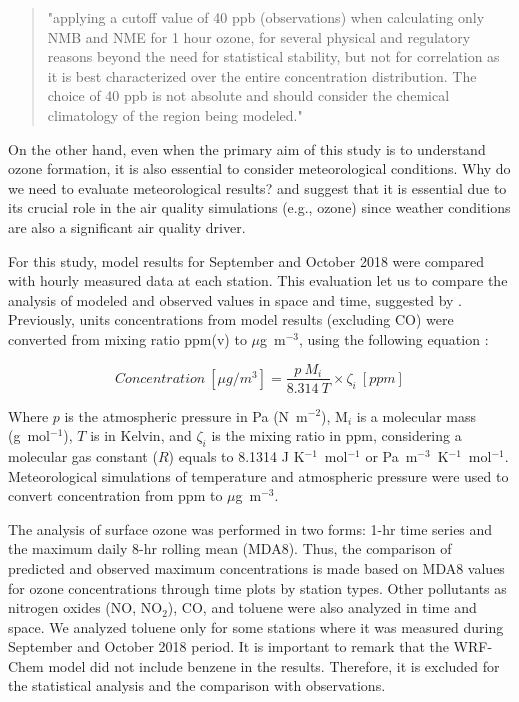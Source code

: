   \begin{quote}
  	"applying a cutoff value of 40 ppb (observations) when calculating only NMB and NME for 1 hour ozone, for several physical and regulatory reasons beyond the need for statistical stability, but not for correlation as it is best characterized over the entire concentration distribution. The choice of 40 ppb is not absolute and should consider the chemical climatology of the region being modeled."
  \end{quote}
  
  On the other hand, even when the primary aim of this study is to understand ozone formation, it is also essential to consider meteorological conditions.
  Why do we need to evaluate meteorological results?  \citet{Emery2017} and \citet{Monk2019} suggest that it is essential due to its crucial role in the air quality simulations (e.g., ozone) since weather conditions are also a significant air quality driver.
  
  For this study, model results for September and October 2018 were compared with hourly measured data at each station.
  This evaluation let us to compare the analysis of modeled and observed values in space and time, suggested by \citet{Seinfeld2016}.
  Previously, units concentrations from model results (excluding CO) were converted from mixing ratio ppm(v) to $\mu$g~m$^{-3}$, using the following equation \citep{Seinfeld2016}:
  
  \begin{equation}
	Concentration ~[\mu g/m^3] = \frac{p ~M_i}{8.314~ T}\times \zeta _i ~[ppm] \label{eq:conv}
 \end{equation}
  
  Where $p$ is the atmospheric pressure in Pa (N~m$^{-2}$), M$_i$ is a molecular mass (g~mol$^{-1}$), $T$ is in Kelvin, and $\zeta _i$ is the mixing ratio in ppm, considering a molecular gas constant ($R$) equals to 8.1314 J K$^{-1}$~mol$^{-1}$ or Pa~m$^{-3}$~K$^{-1}$~mol$^{-1}$.
  Meteorological simulations of temperature and atmospheric pressure were used to convert concentration from ppm to $\mu$g~m$^{-3}$.
  
   The analysis of surface ozone was performed in two forms: 1-hr time series and the maximum daily 8-hr rolling mean (MDA8).
   Thus, the comparison of predicted and observed maximum concentrations is made based on MDA8 values for ozone concentrations through time plots by station types.
  Other pollutants as nitrogen oxides (NO, NO$_2$), CO, and toluene were also analyzed in time and space.
  We analyzed toluene only for some stations where it was measured during September and October 2018 period. 
  It is important to remark that the WRF-Chem model did not include benzene in the results.
  Therefore, it is excluded for the statistical analysis and the comparison with observations.
 
